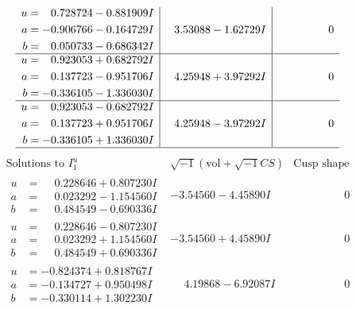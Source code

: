 \documentclass[1p]{elsarticle_modified}
\theoremstyle{definition}
\newcommand{\I}{\sqrt{-1}}
\begin{document}
$$\begin{array}{c|c|c}
\begin{aligned}
u &= \phantom{-}0.728724 - 0.881909 I \\
a &= -0.906766 - 0.164729 I \\
b &= \phantom{-}0.050733 - 0.686342 I\end{aligned}
 & \phantom{-}3.53088 - 1.62729 I & \phantom{-0.000000 } 0 \\ \hline\begin{aligned}
u &= \phantom{-}0.923053 + 0.682792 I \\
a &= \phantom{-}0.137723 - 0.951706 I \\
b &= -0.336105 - 1.336030 I\end{aligned}
 & \phantom{-}4.25948 + 3.97292 I & \phantom{-0.000000 } 0 \\ \hline\begin{aligned}
u &= \phantom{-}0.923053 - 0.682792 I \\
a &= \phantom{-}0.137723 + 0.951706 I \\
b &= -0.336105 + 1.336030 I\end{aligned}
 & \phantom{-}4.25948 - 3.97292 I & \phantom{-0.000000 } 0\\
 \hline 
 \end{array}$$\newpage$$\begin{array}{c|c|c}  
\text{Solutions to }I^u_{1}& \I (\text{vol} + \sqrt{-1}CS) & \text{Cusp shape}\\
 \hline 
\begin{aligned}
u &= \phantom{-}0.228646 + 0.807230 I \\
a &= \phantom{-}0.023292 - 1.154560 I \\
b &= \phantom{-}0.484549 - 0.690336 I\end{aligned}
 & -3.54560 - 4.45890 I & \phantom{-0.000000 } 0 \\ \hline\begin{aligned}
u &= \phantom{-}0.228646 - 0.807230 I \\
a &= \phantom{-}0.023292 + 1.154560 I \\
b &= \phantom{-}0.484549 + 0.690336 I\end{aligned}
 & -3.54560 + 4.45890 I & \phantom{-0.000000 } 0 \\ \hline\begin{aligned}
u &= -0.824374 + 0.818767 I \\
a &= -0.134727 + 0.950498 I \\
b &= -0.330114 + 1.302230 I\end{aligned}
 & \phantom{-}4.19868 - 6.92087 I & \phantom{-0.000000 } 0 \\ \hline\begin{aligned}

\end{aligned}
\end{array}$$
\end{document}
